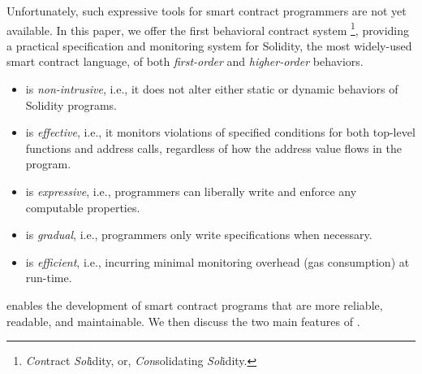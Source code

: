 Unfortunately, such expressive tools for smart contract programmers are not yet available. %
In this paper, we offer the first behavioral contract system \lang \footnote{\emph{Con}tract \emph{Sol}idity, or, \emph{Con}solidating \emph{Sol}idity.}, providing a practical
specification and monitoring system for Solidity, the most widely-used smart contract language, of both  \textit{first-order} and \textit{higher-order} behaviors.
\begin{itemize}[leftmargin=0.3cm, topsep=1.5pt]
  \item \lang is \emph{non-intrusive}, i.e., it does not alter either static or dynamic behaviors of Solidity programs.
  \item \lang is \emph{effective}, i.e., it monitors violations of specified conditions for both top-level functions and address calls, regardless of how the address value flows in the program.
  \item \lang is \emph{expressive}, i.e., programmers can liberally write and enforce any computable properties.
  \item \lang is \emph{gradual}, i.e., programmers only write specifications when necessary.
  \item \lang is \emph{efficient}, i.e., incurring minimal monitoring overhead (gas consumption) at run-time.
\end{itemize}
\lang enables the development of smart contract programs that are more reliable, readable, and maintainable. 
We then discuss the two main features of \lang.



